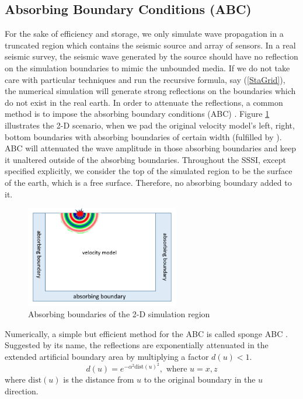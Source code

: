\documentclass[11pt]{article}
\theoremstyle{plain}
\theoremstyle{definition}
\theoremstyle{remark}
\numberwithin{equation}{section}
\begin{document}
\subsection{Absorbing Boundary Conditions (ABC)}
For the sake of efficiency and storage, we only simulate wave propagation in a truncated region which contains the seismic source and array of sensors. In a real seismic survey, the seismic wave generated by the source should have no reflection on the simulation boundaries to mimic the unbounded media. If we do not take care with particular techniques and run the recursive formula, say (\ref{StaGrid}), the numerical simulation will generate strong reflections on the boundaries which do not exist in the real earth. In order to attenuate the reflections, a common method is to impose the absorbing boundary conditions (ABC) \cite{EngMaj1977, ClaEng1977}. Figure \ref{fig:ABC} illustrates the 2-D scenario, when we pad the original velocity model's left, right, bottom boundaries with absorbing boundaries of certain width (fulfilled by ). ABC will attenuated the wave amplitude in those absorbing boundaries and keep it unaltered outside of the absorbing boundaries. Throughout the SSSI, except specified explicitly, we consider the top of the simulated region to be the surface of the earth, which is a free surface. Therefore, no absorbing boundary added to it.

\begin{figure}
\centering
\includegraphics[width=0.6\textwidth]{Fig/abc.png}
\caption{Absorbing boundaries of the 2-D simulation region}
\label{fig:ABC}
\end{figure}

Numerically, a simple but efficient method for the ABC is called sponge ABC \cite{CerKosAO1985}. Suggested by its name, the reflections are exponentially attenuated in the extended artificial boundary area by multiplying a factor $d(u) < 1$.
\begin{equation}
  d(u) = e^{-\alpha^2\text{dist}(u)^2}, \mbox{  where  } u=x, z
\end{equation}
where $\text{dist}(u)$ is the distance from $u$ to the original boundary in the $u$ direction. 
\end{document}
